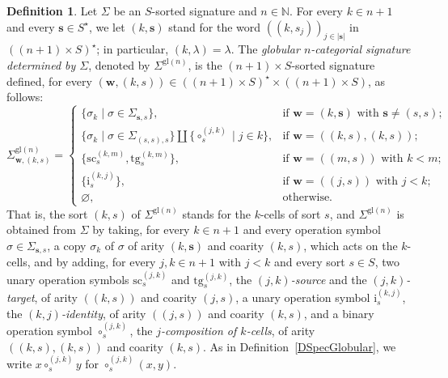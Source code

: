\documentclass[a4paper, reqno
]{amsart}
\newcommand{\gl}{\mathrm{gl}}                %
\newcommand{\src}{\mathrm{sc}}
\newcommand{\tgt}{\mathrm{tg}}
\theoremstyle{plain}
\theoremstyle{definition}
\newtheorem{definition}[theorem]{Definition}
\begin{document}
\begin{definition}\label{DSigmaCatGlobular}
Let $\Sigma$ be an $S$-sorted signature and $n\in\mathbb{N}$.
For every $k\in n+1$ and every $\mathbf{s}\in S^{\star}$, we let $(k,\mathbf{s})$ stand for the word $((k,s_{j}))_{j\in\lvert\mathbf{s}\rvert}$ in $((n+1)\times S)^{\star}$; in particular, $(k,\lambda)=\lambda$.
The \emph{globular $n$-categorial signature determined by $\Sigma$}, denoted by $\Sigma^{\gl(n)}$, is the $(n+1)\times S$-sorted signature defined, for every $(\mathbf{w},(k,s))\in((n+1)\times S)^{\star}\times((n+1)\times S)$, as follows:
$$
{\Sigma}^{\gl(n)}_{\mathbf{w},(k,s)}=
\begin{cases}
\{\sigma_{k}\mid\sigma\in{\Sigma}_{\mathbf{s},s}\},
& \text{if $\mathbf{w}=(k,\mathbf{s})$ with $\mathbf{s}\neq(s,s)$;}\\
\{\sigma_{k}\mid\sigma\in{\Sigma}_{(s,s),s}\}\amalg\{\circ^{(j,k)}_{s}\mid j\in k\},
& \text{if $\mathbf{w}=((k,s),(k,s))$;}\\
\{\src^{(k,m)}_{s}, \tgt^{(k,m)}_{s}\},
& \text{if $\mathbf{w}=((m,s))$ with $k<m$;}\\
\{\mathrm{i}^{(k,j)}_{s}\},
& \text{if $\mathbf{w}=((j,s))$ with $j<k$;}\\
\varnothing,
& \text{otherwise.}
\end{cases}
$$
That is, the sort $(k,s)$ of ${\Sigma}^{\gl(n)}$ stands for the $k$-cells of sort $s$, and ${\Sigma}^{\gl(n)}$ is obtained from $\Sigma$ by taking, for every $k\in n+1$ and every operation symbol $\sigma\in\Sigma_{\mathbf{s},s}$, a copy $\sigma_{k}$ of $\sigma$ of arity $(k,\mathbf{s})$ and coarity $(k,s)$, which acts on the $k$-cells, and by adding, for every $j,k\in n+1$ with $j<k$ and every sort $s\in S$, two unary operation symbols $\src^{(j,k)}_{s}$ and $\tgt^{(j,k)}_{s}$, the \emph{$(j,k)$-source} and the \emph{$(j,k)$-target}, of arity $((k,s))$ and coarity $(j,s)$, a unary operation symbol $\mathrm{i}^{(k,j)}_{s}$, the \emph{$(k,j)$-identity}, of arity $((j,s))$ and coarity $(k,s)$, and a binary operation symbol $\circ^{(j,k)}_{s}$, the \emph{$j$-composition of $k$-cells}, of arity $((k,s),(k,s))$ and coarity $(k,s)$.
As in Definition~\ref{DSpecGlobular}, we write $x\circ^{(j,k)}_{s}y$ for $\circ^{(j,k)}_{s}(x,y)$.


\end{definition}
\end{document}
